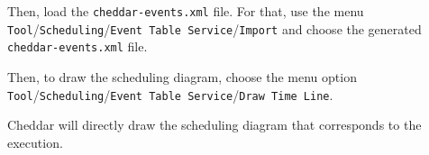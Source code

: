    Then, load the \texttt{cheddar-events.xml} file. For that, use the menu \texttt{Tool}/\texttt{Scheduling}/\texttt{Event Table Service}/\texttt{Import}
   and choose the generated \texttt{cheddar-events.xml} file.

   Then, to draw the scheduling diagram, choose the menu option \texttt{Tool}/\texttt{Scheduling}/\texttt{Event Table Service}/\texttt{Draw Time Line}.

   Cheddar will directly draw the scheduling diagram that corresponds to the execution.

